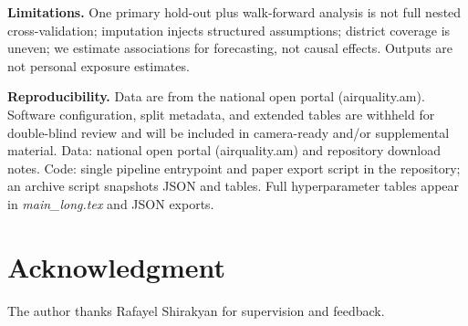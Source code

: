 \documentclass[conference]{IEEEtran}
\begin{document}
\textbf{Limitations.} One primary hold-out plus walk-forward analysis is not full nested cross-validation; imputation injects structured assumptions; district coverage is uneven; we estimate associations for forecasting, not causal effects. Outputs are not personal exposure estimates.

\textbf{Reproducibility.}
\ificdsgreview
Data are from the national open portal (airquality.am). Software configuration, split metadata, and extended tables are withheld for double-blind review and will be included in camera-ready and/or supplemental material.
\else
Data: national open portal (airquality.am) and repository download notes. Code: single pipeline entrypoint and paper export script in the repository; an archive script snapshots JSON and tables. Full hyperparameter tables appear in \emph{main\_long.tex} and JSON exports.
\fi

\ificdsgreview
\else
\section*{Acknowledgment}
The author thanks Rafayel Shirakyan for supervision and feedback.
\fi


\end{document}
